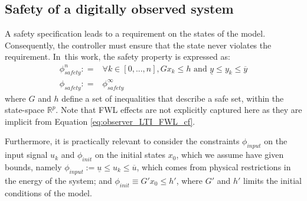 \documentclass[sigconf]{llncs}
\newcommand{\mat}[1]{{#1}}
\renewcommand{\vec}[1]{{#1}}
\begin{document}
\subsection{Safety of a digitally observed system}\label{sec:cof_safety}
A safety specification leads to a requirement on the states of
the model. Consequently, the controller must ensure that the state
never violates the requirement.  In~this work, the safety property is
expressed as:
%
\begin{align}
\phi_\mathit{safety}^n: = & \forall k \in [0, ... , n], \mat{G}\vec{x}_k \leq \vec{h} \text{ and } \underline{y} \leq y_k \leq \overline{y}\nonumber\\
\phi_\mathit{safety}: = & \phi_\mathit{safety}^\infty
\label{eq:safetyspec}
\end{align}
%
where $\mat{G}$ and $\vec{h}$ define a set of inequalities that describe 
a safe set, within the state-space $\mathbb{R}^p$.
%
Note that FWL effects are not explicitly captured here
as they are implicit from Equation \eqref{eq:observer_LTI_FWL_cf}.

Furthermore, it is practically relevant to consider the 
constraints $\phi_\mathit{input}$ on the input
signal $u_{k}$ and $\phi_\mathit{init}$ on the initial states $x_0$,
which we assume have given bounds, namely 
$\phi_\mathit{input} := \underline{u} \leq u_k \leq \overline{u}$, 
which comes from physical restrictions in the energy of the system; and
$\phi_\mathit{init}\equiv \mat{G}' \vec{x}_0 \leq \vec{h}'$,
where $\mat{G}'$ and $\vec{h}'$ limits the initial conditions of the model. 

%
%
\end{document}
